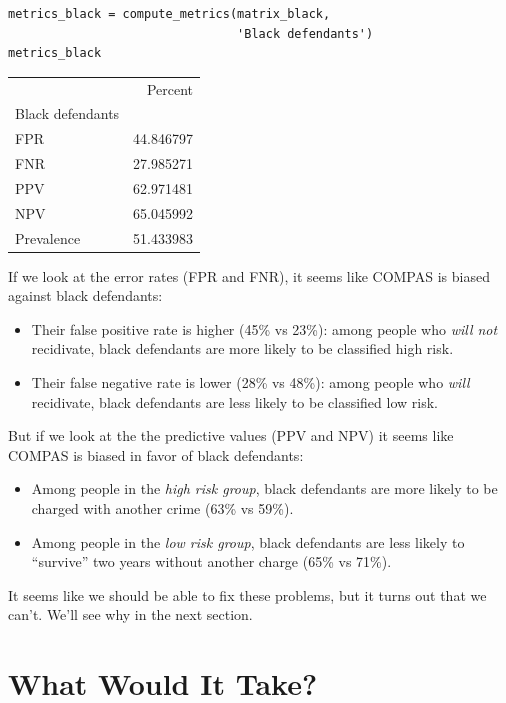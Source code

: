 \begin{lstlisting}[]
metrics_black = compute_metrics(matrix_black, 
                                'Black defendants')
metrics_black
\end{lstlisting}

\begin{tabular}{lr}
\midrule
{} &    Percent \\
Black defendants &            \\
\midrule
FPR              &  44.846797 \\
FNR              &  27.985271 \\
PPV              &  62.971481 \\
NPV              &  65.045992 \\
Prevalence       &  51.433983 \\
\midrule
\end{tabular}

If we look at the error rates (FPR and FNR), it seems like COMPAS is
biased against black defendants:

\begin{itemize}
\item
  Their false positive rate is higher (45\% vs 23\%): among people who
  \emph{will not} recidivate, black defendants are more likely to be
  classified high risk.
\item
  Their false negative rate is lower (28\% vs 48\%): among people who
  \emph{will} recidivate, black defendants are less likely to be
  classified low risk.
\end{itemize}

But if we look at the the predictive values (PPV and NPV) it seems like
COMPAS is biased in favor of black defendants:

\begin{itemize}
\item
  Among people in the \emph{high risk group}, black defendants are more
  likely to be charged with another crime (63\% vs 59\%).
\item
  Among people in the \emph{low risk group}, black defendants are less
  likely to ``survive'' two years without another charge (65\% vs 71\%).
\end{itemize}

It seems like we should be able to fix these problems, but it turns out
that we can't. We'll see why in the next section.

\hypertarget{what-would-it-take}{%
\section{What Would It Take?}\label{what-would-it-take}}

